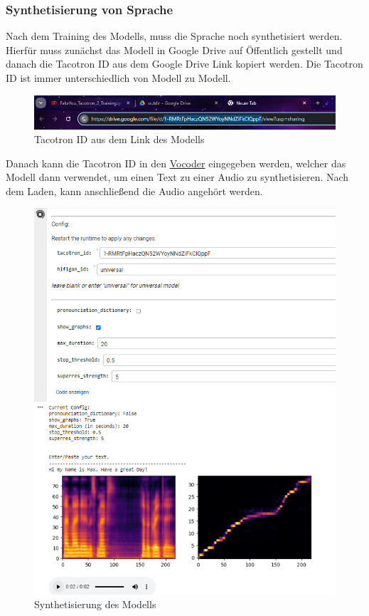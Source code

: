 \subsubsection*{Synthetisierung von Sprache}
Nach dem Training des Modells, muss die Sprache noch synthetisiert werden. Hierfür muss zunächst das Modell in Google Drive auf Öffentlich gestellt und danach die Tacotron ID aus dem Google Drive Link kopiert werden. Die Tacotron ID ist immer unterschiedlich von Modell zu Modell.
\begin{figure}[H]
    \includegraphics[width=1.0\textwidth]{Bilder/AudioTrainingLink}
    \centering
    \caption{Tacotron ID aus dem Link des Modells}
    \label{fig:TrainingLink}
\end{figure}
Danach kann die Tacotron ID in den \href{https://colab.research.google.com/github/justinjohn0306/FakeYou-Tacotron2-Notebook/blob/main/FakeYou_Tacotron2_Hi_Fi_GAN_(CPU).ipynb#scrollTo=nU8YYg6PXgjg}{Vocoder} eingegeben werden, welcher das Modell dann verwendet, um einen Text zu einer Audio zu synthetisieren. Nach dem Laden, kann anschließend die Audio angehört werden.
\begin{figure}[H]
    \includegraphics[width=1.0\textwidth]{Bilder/AudioTrainingSynth}
    \centering
    \caption{Synthetisierung des Modells}
    \label{fig:TrainingSynth}
\end{figure}